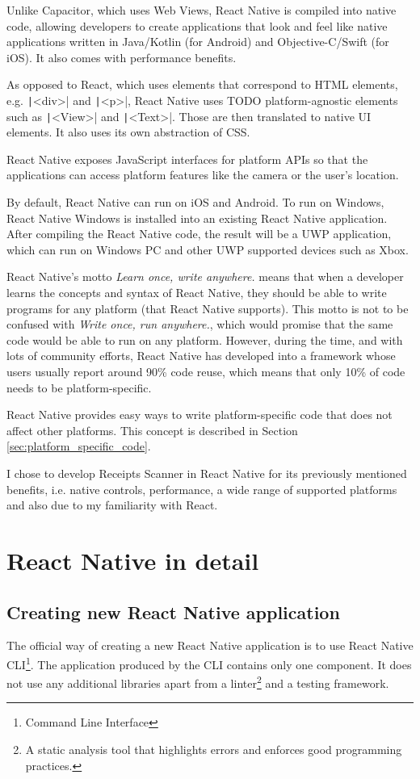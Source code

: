 \documentclass[
  digital, %
  table,   %
  oneside, %
  lof,     %
  lot,     %
]{fithesis3}
\newcommand{\code}[1]{\texttt|#1|} %
\begin{document}
Unlike Capacitor, which uses Web Views, React Native is compiled into native code, allowing developers to create applications that look and feel like native applications written in Java/Kotlin (for Android) and Objective-C/Swift (for iOS). It also comes with performance benefits. 

As opposed to React, which uses elements that correspond to HTML elements, e.g. \code{<div>} and \code{<p>}, React Native uses TODO platform-agnostic elements such as \code{<View>} and \code{<Text>}. Those are then translated to native UI elements. It also uses its own abstraction of CSS.

React Native exposes JavaScript interfaces for platform APIs so that the applications can access platform features like the camera or the user’s location.

By default, React Native can run on iOS and Android. To run on Windows, React Native Windows is installed into an existing React Native application. After compiling the React Native code, the result will be a UWP application, which can run on Windows PC and other UWP supported devices such as Xbox.

React Native's motto \textit{Learn once, write anywhere.} means that when a developer learns the concepts and syntax of React Native, they should be able to write programs for any platform (that React Native supports). This motto is not to be confused with \textit{Write once, run anywhere.}, which would promise that the same code would be able to run on any platform. However, during the time, and with lots of community efforts, React Native has developed into a framework whose users usually report around 90\% code reuse, which means that only 10\% of code needs to be platform-specific. 

React Native provides easy ways to write platform-specific code that does not affect other platforms. This concept is described in Section \ref{sec:platform_specific_code}.

I chose to develop Receipts Scanner in React Native for its previously mentioned benefits, i.e. native controls, performance, a wide range of supported platforms and also due to my familiarity with React.

\chapter{React Native in detail}

\section{Creating new React Native application}
The official way of creating a new React Native application is to use React Native CLI\footnote{Command Line Interface}. The application produced by the CLI contains only one component. It does not use any additional libraries apart from a linter\footnote{A static analysis tool that highlights errors and enforces good programming practices.} and a testing framework.
\end{document}
